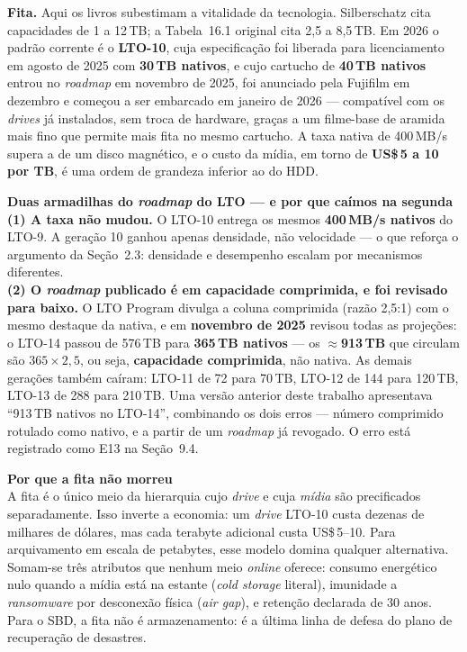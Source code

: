 \documentclass[11pt,a4paper]{article}
\newcommand{\destaque}[2]{%
  \begin{center}\begin{minipage}{0.96\textwidth}
  \colorbox{fundo}{\begin{minipage}{\dimexpr\linewidth-2\fboxsep}
  \vspace{3pt}\textbf{\color{azul}#1}\\[2pt]\small #2\vspace{4pt}
  \end{minipage}}\end{minipage}\end{center}}
\newcommand{\correcao}[2]{%
  \begin{center}\begin{minipage}{0.96\textwidth}
  \colorbox{fundo}{\begin{minipage}{\dimexpr\linewidth-2\fboxsep}
  \vspace{3pt}\textbf{\color{laranja}#1}\\[2pt]\small #2\vspace{4pt}
  \end{minipage}}\end{minipage}\end{center}}
\begin{document}
\textbf{Fita.} Aqui os livros subestimam a vitalidade da tecnologia. Silberschatz cita
capacidades de 1 a 12\,TB; a Tabela~16.1 original cita 2,5 a 8,5\,TB. Em 2026 o padrão
corrente é o \textbf{LTO-10}, cuja especificação foi liberada para licenciamento em agosto
de 2025 com \textbf{30\,TB nativos}, e cujo cartucho de \textbf{40\,TB nativos} entrou no
\emph{roadmap} em novembro de 2025, foi anunciado pela Fujifilm em dezembro e começou a ser
embarcado em janeiro de 2026 --- compatível com os \emph{drives} já instalados, sem troca de
hardware, graças a um filme-base de aramida mais fino que permite mais fita no mesmo
cartucho. A taxa nativa de 400\,MB/s supera a de um disco magnético, e o custo da mídia, em
torno de \textbf{US\$\,5 a 10 por TB}, é uma ordem de grandeza inferior ao do HDD.

\correcao{Duas armadilhas do \emph{roadmap} do LTO --- e por que caímos na segunda}{%
\textbf{(1) A taxa não mudou.} O LTO-10 entrega os mesmos \textbf{400\,MB/s nativos} do
LTO-9. A geração 10 ganhou apenas densidade, não velocidade --- o que reforça o argumento da
Seção~2.3: densidade e desempenho escalam por mecanismos diferentes.\\[4pt]
\textbf{(2) O \emph{roadmap} publicado é em capacidade comprimida, e foi revisado para
baixo.} O LTO Program divulga a coluna comprimida (razão 2,5:1) com o mesmo destaque da
nativa, e em \textbf{novembro de 2025} revisou todas as projeções: o LTO-14 passou de
576\,TB para \textbf{365\,TB nativos} --- os \textbf{$\approx$913\,TB} que circulam são
$365 \times 2{,}5$, ou seja, \textbf{capacidade comprimida}, não nativa. As demais gerações
também caíram: LTO-11 de 72 para 70\,TB, LTO-12 de 144 para 120\,TB, LTO-13 de 288 para
210\,TB. Uma versão anterior deste trabalho apresentava ``913\,TB nativos no LTO-14'',
combinando os dois erros --- número comprimido rotulado como nativo, e a partir de um
\emph{roadmap} já revogado. O erro está registrado como E13 na Seção~9.4.}

\destaque{Por que a fita não morreu}{%
A fita é o único meio da hierarquia cujo \emph{drive} e cuja \emph{mídia} são precificados
separadamente. Isso inverte a economia: um \emph{drive} LTO-10 custa dezenas de milhares de
dólares, mas cada terabyte adicional custa US\$\,5--10. Para arquivamento em escala de
petabytes, esse modelo domina qualquer alternativa. Somam-se três atributos que nenhum meio
\emph{online} oferece: consumo energético nulo quando a mídia está na estante
(\emph{cold storage} literal), imunidade a \emph{ransomware} por desconexão física
(\emph{air gap}), e retenção declarada de 30 anos. Para o SBD, a fita não é armazenamento:
é a última linha de defesa do plano de recuperação de desastres.}
\end{document}
